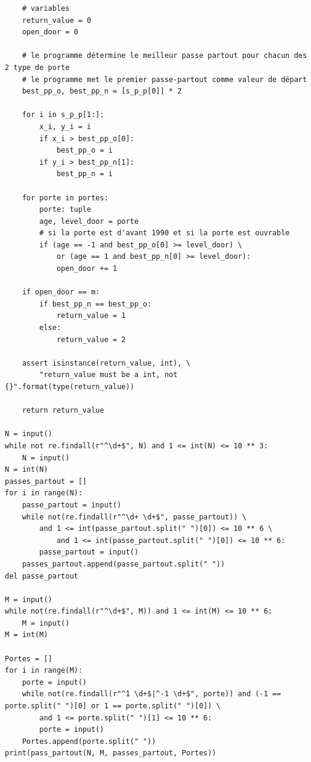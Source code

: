 \documentclass{article}
\begin{document}
\begin{verbatim}
    # variables
    return_value = 0
    open_door = 0

    # le programme détermine le meilleur passe partout pour chacun des 2 type de porte
    # le programme met le premier passe-partout comme valeur de départ
    best_pp_o, best_pp_n = [s_p_p[0]] * 2

    for i in s_p_p[1:]:
        x_i, y_i = i
        if x_i > best_pp_o[0]:
            best_pp_o = i
        if y_i > best_pp_n[1]:
            best_pp_n = i

    for porte in portes:
        porte: tuple
        age, level_door = porte
        # si la porte est d'avant 1990 et si la porte est ouvrable
        if (age == -1 and best_pp_o[0] >= level_door) \
            or (age == 1 and best_pp_n[0] >= level_door):
            open_door += 1

    if open_door == m:
        if best_pp_n == best_pp_o:
            return_value = 1
        else:
            return_value = 2

    assert isinstance(return_value, int), \
        "return_value must be a int, not {}".format(type(return_value))

    return return_value

N = input()
while not re.findall(r"^\d+$", N) and 1 <= int(N) <= 10 ** 3:
    N = input()
N = int(N)
passes_partout = []
for i in range(N):
    passe_partout = input()
    while not(re.findall(r"^\d+ \d+$", passe_partout)) \
        and 1 <= int(passe_partout.split(" ")[0]) <= 10 ** 6 \
            and 1 <= int(passe_partout.split(" ")[0]) <= 10 ** 6:
        passe_partout = input()
    passes_partout.append(passe_partout.split(" "))
del passe_partout

M = input()
while not(re.findall(r"^\d+$", M)) and 1 <= int(M) <= 10 ** 6:
    M = input()
M = int(M)

Portes = []
for i in range(M):
    porte = input()
    while not(re.findall(r"^1 \d+$|^-1 \d+$", porte)) and (-1 == porte.split(" ")[0] or 1 == porte.split(" ")[0]) \
        and 1 <= porte.split(" ")[1] <= 10 ** 6:
        porte = input()
    Portes.append(porte.split(" "))
print(pass_partout(N, M, passes_partout, Portes))

            \end{verbatim}
        \newpage
\end{document}

